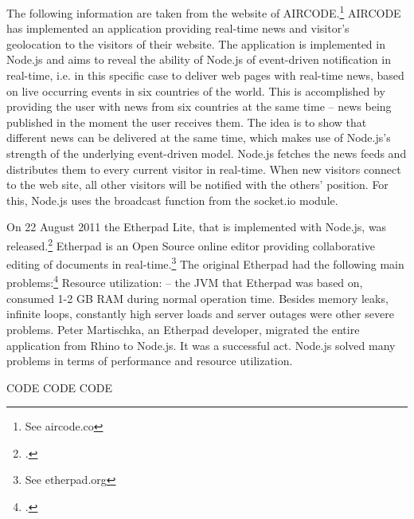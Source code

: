 \begin{appendices}
\begin{subappendices}
The following information are taken from the website of AIRCODE.\footnote{See aircode.co}
AIRCODE has implemented an application providing real-time news and visitor’s geolocation to the visitors of their website. The application is implemented in Node.js and aims to reveal the ability of Node.js of event-driven notification in real-time, i.e. in this specific case to deliver web pages with real-time news, based on live occurring events in six countries of the world. This is accomplished by providing the user with news from six countries at the same time – news being published in the moment the user receives them. The idea is to show that different news can be delivered at the same time, which makes use of Node.js’s strength of the underlying event-driven model.
Node.js fetches the news feeds and distributes them to every current visitor in real-time. When new visitors connect to the web site, all other visitors will be notified with the others’ position. For this, Node.js uses the broadcast function from the socket.io module.

On 22 August 2011 the Etherpad Lite, that is implemented with Node.js, was released.\footcite[Cf.][]{Martischka_2011}  Etherpad is an Open Source online editor providing collaborative editing of documents in real-time.\footnote{See etherpad.org} The original Etherpad had the following main problems:\footcite[Cf.][]{Martischka_2011} Resource utilization: – the JVM that Etherpad was based on, consumed 1-2 GB RAM during normal operation time. Besides memory leaks, infinite loops, constantly high server loads and server outages were other severe problems.
Peter Martischka, an Etherpad developer, migrated the entire application from Rhino to Node.js. It was a successful act. Node.js solved many problems in terms of performance and resource utilization. 



\label{appendix_meteor}
CODE CODE CODE

\end{subappendices}
\end{appendices}